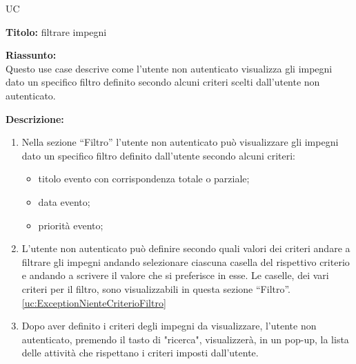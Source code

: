 \begin{listaPersonale}{UC}
    \newpage


    \begin{center}
        
    \end{center}
    \begin{listaPersonale2}[UC] {}
            \textbf{Titolo:} filtrare impegni

            \textbf{Riassunto:} \\
            Questo use case descrive come l'utente non autenticato visualizza gli impegni dato un specifico filtro definito secondo alcuni criteri scelti dall'utente non autenticato.

            \textbf{Descrizione:}
            \begin{enumerate}
                \item Nella sezione “Filtro” l'utente non autenticato può visualizzare gli impegni dato un specifico filtro definito dall'utente secondo alcuni criteri:
                      \begin{itemize}
                          \item titolo evento con corrispondenza totale o parziale;
                          \item data evento;
                          \item priorità evento;
                      \end{itemize}

                \item L'utente non autenticato può definire secondo quali valori dei criteri andare a filtrare gli impegni andando selezionare ciascuna casella del rispettivo criterio e andando a scrivere il valore che si preferisce in esse. Le caselle, dei vari criteri per il filtro, sono visualizzabili in questa sezione “Filtro”. \ref{uc:ExceptionNienteCriterioFiltro}
                \item Dopo aver definito i criteri degli impegni da visualizzare, l'utente non autenticato, premendo il tasto di "ricerca", visualizzerà, in un pop-up, la lista delle attività che rispettano i criteri imposti dall'utente.
            \end{enumerate}



\end{listaPersonale2}
\end{listaPersonale}
